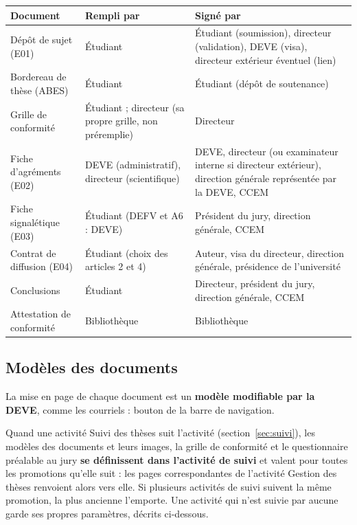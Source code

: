 \documentclass[11pt,a4paper]{article}
\begin{document}
\begin{center}
\small
\begin{tabularx}{\linewidth}{@{}l X X@{}}
\toprule
\textbf{Document} & \textbf{Rempli par} & \textbf{Signé par} \\
\midrule
Dépôt de sujet (E01) & Étudiant & Étudiant (soumission), directeur (validation),
DEVE (visa), directeur extérieur éventuel (lien) \\
Bordereau de thèse (ABES) & Étudiant & Étudiant (dépôt de soutenance) \\
Grille de conformité & Étudiant ; directeur (sa propre grille, non préremplie) & Directeur \\
Fiche d'agréments (E02) & DEVE (administratif), directeur (scientifique) &
DEVE, directeur (ou examinateur interne si directeur extérieur), direction générale
représentée par la DEVE, CCEM \\
Fiche signalétique (E03) & Étudiant (DEFV et A6 : DEVE) & Président du jury, direction générale,
CCEM \\
Contrat de diffusion (E04) & Étudiant (choix des articles 2 et 4) & Auteur,
visa du directeur, direction générale, présidence de l'université \\
Conclusions & Étudiant & Directeur, président du jury, direction générale,
CCEM \\
Attestation de conformité & Bibliothèque & Bibliothèque \\
\bottomrule
\end{tabularx}
\end{center}


\subsection{Modèles des documents}\label{sec:modeles}

La mise en page de chaque document est un \textbf{modèle modifiable par la DEVE},
comme les courriels : bouton  de la barre de
navigation.

\begin{astuce}
Quand une activité \og Suivi des thèses\fg{} suit l'activité
(section~\ref{sec:suivi}), les modèles des documents et leurs images, la grille
de conformité et le questionnaire préalable au jury \textbf{se définissent dans
l'activité de suivi} et valent pour toutes les promotions qu'elle suit : les
pages correspondantes de l'activité \og Gestion des thèses\fg{} renvoient alors
vers elle. Si plusieurs activités de suivi suivent la même promotion, la plus
ancienne l'emporte. Une activité qui n'est suivie par aucune garde ses propres
paramètres, décrits ci-dessous.
\end{astuce}
\end{document}
